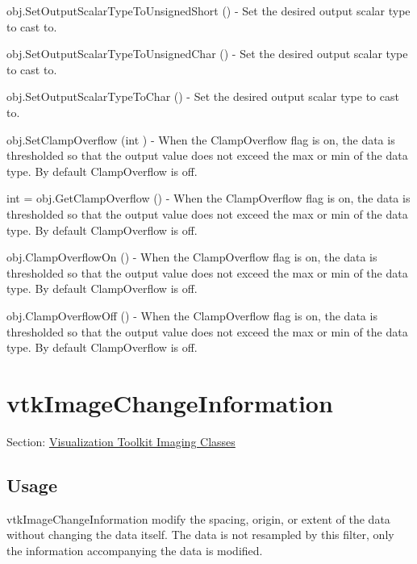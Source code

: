 \begin{DoxyItemize}
\item {\ttfamily obj.\-Set\-Output\-Scalar\-Type\-To\-Unsigned\-Short ()} -\/ Set the desired output scalar type to cast to.  
\item {\ttfamily obj.\-Set\-Output\-Scalar\-Type\-To\-Unsigned\-Char ()} -\/ Set the desired output scalar type to cast to.  
\item {\ttfamily obj.\-Set\-Output\-Scalar\-Type\-To\-Char ()} -\/ Set the desired output scalar type to cast to.  
\item {\ttfamily obj.\-Set\-Clamp\-Overflow (int )} -\/ When the Clamp\-Overflow flag is on, the data is thresholded so that the output value does not exceed the max or min of the data type. By default Clamp\-Overflow is off.  
\item {\ttfamily int = obj.\-Get\-Clamp\-Overflow ()} -\/ When the Clamp\-Overflow flag is on, the data is thresholded so that the output value does not exceed the max or min of the data type. By default Clamp\-Overflow is off.  
\item {\ttfamily obj.\-Clamp\-Overflow\-On ()} -\/ When the Clamp\-Overflow flag is on, the data is thresholded so that the output value does not exceed the max or min of the data type. By default Clamp\-Overflow is off.  
\item {\ttfamily obj.\-Clamp\-Overflow\-Off ()} -\/ When the Clamp\-Overflow flag is on, the data is thresholded so that the output value does not exceed the max or min of the data type. By default Clamp\-Overflow is off.  
\end{DoxyItemize}\hypertarget{vtkimaging_vtkimagechangeinformation}{}\section{vtk\-Image\-Change\-Information}\label{vtkimaging_vtkimagechangeinformation}
Section\-: \hyperlink{sec_vtkimaging}{Visualization Toolkit Imaging Classes} \hypertarget{vtkwidgets_vtkxyplotwidget_Usage}{}\subsection{Usage}\label{vtkwidgets_vtkxyplotwidget_Usage}
vtk\-Image\-Change\-Information modify the spacing, origin, or extent of the data without changing the data itself. The data is not resampled by this filter, only the information accompanying the data is modified.

